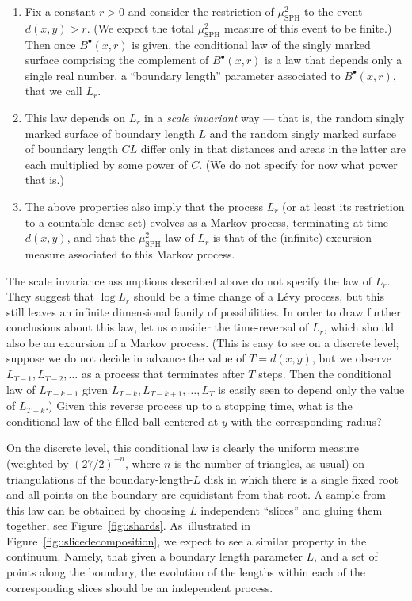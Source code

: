 \documentclass[JEP,XML,SOM,Unicode]{cedram}
\newcommand{\sbullet}{{\scriptscriptstyle\bullet}}
\theoremstyle{plain}
\numberwithin{theorem}{section}
\theoremstyle{definition}
\newcommand{\mustwo}{\mu_{\mathrm{SPH}}^2}
\newcommand{\fb}[2]{B^\sbullet(#1,#2)}
\begin{document}
\begin{enumerate}
\item Fix a constant $r > 0$ and consider the restriction of $\mustwo$ to the event $d(x,y) > r$. (We expect the total $\mustwo$ measure of this event to be finite.) Then once $\fb{x}{r}$ is given, the conditional law of the singly marked surface comprising the complement of $\fb{x}{r}$ is a law that depends only a single real number, a ``boundary length'' parameter associated to $\fb{x}{r}$, that we call $L_r$.
\item This law depends on $L_r$ in a \emph{scale invariant} way --- that is, the random singly marked surface of boundary length $L$ and the random singly marked surface of boundary length $CL$ differ only in that distances and areas in the latter are each multiplied by some power of $C$. (We do not specify for now what power that is.)
\item The above properties also imply that the process $L_r$ (or at least its restriction to a countable dense set) evolves as a Markov process, terminating at time $d(x,y)$, and that the $\mustwo$ law of $L_r$ is that of the (infinite) excursion measure associated to this Markov process.
\end{enumerate}

The scale invariance assumptions described above do not specify the law of $L_r$. They suggest that $\log L_r$ should be a time change of a Lévy process, but this still leaves an infinite dimensional family of possibilities. In order to draw further conclusions about this law, let us consider the time-reversal of $L_r$, which should also be an excursion of a Markov process. (This is easy to see on a discrete level; suppose we do not decide in advance the value of $T =d(x,y)$, but we observe $L_{T-1}, L_{T-2}, \ldots$ as a process that terminates after $T$ steps. Then the conditional law of $L_{T-k-1}$ given $L_{T-k},L_{T-k+1},\ldots,L_T$ is easily seen to depend only the value of $L_{T-k}$.) Given this reverse process up to a stopping time, what is the conditional law of the filled ball centered at $y$ with the corresponding radius?

On the discrete level, this conditional law is clearly the uniform measure (weighted by $(27/2)^{-n}$, where $n$ is the number of triangles, as usual) on triangulations of the boundary-length-$L$ disk in which there is a single fixed root and all points on the boundary are equidistant from that root. A sample from this law can be obtained by choosing $L$ independent ``slices'' and gluing them together, see Figure~\ref{fig::shards}. As~illustrated in Figure~\ref{fig::slicedecomposition}, we expect to see a similar property in the continuum. Namely, that given a boundary length parameter $L$, and a set of points along the boundary, the evolution of the lengths within each of the corresponding slices should be an independent process.
\end{document}
